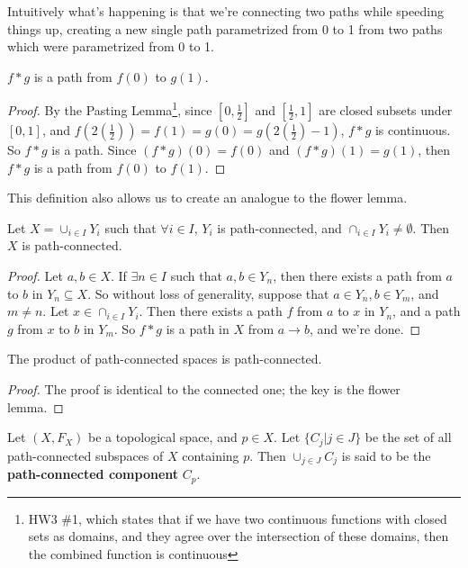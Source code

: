 Intuitively what's happening is that we're connecting two paths while  speeding things up, creating a new single path parametrized from 0 to 1 from two paths which were parametrized from 0 to 1.

\begin{smallfact}
$f\ast g$ is a path from $f(0)$ to $g(1)$. 
\end{smallfact}
\begin{proof}
By the Pasting Lemma\footnote{HW3 \#1, which states that if we have two continuous functions with closed sets as domains, and they agree over the intersection of these domains, then the combined function is continuous}, since $[0,\frac{1}{2}]$ and $[\frac{1}{2},1]$ are closed subsets under $[0,1]$, and $f(2 (\frac{1}{2} )) = f(1) = g(0) = g(2 (\frac{1}{2}) - 1 )$, $f\ast g$ is continuous. So $f\ast g$ is a path. Since $(f\ast g)(0) = f(0)$ and $(f\ast g) (1) = g(1)$, then $f\ast g$ is a path from $f(0)$ to $f(1)$. 
\end{proof}

This definition also allows us to create an analogue to the flower lemma.
\begin{theorem}
Let $X = \cup_{i\in I} Y_i$ such that  $\forall i\in I$, $Y_i$ is path-connected, and $\cap_{i\in I} Y_i \neq \emptyset$. Then $X$ is path-connected.
\end{theorem}
\begin{proof}
Let $a,b\in X$. If $\exists n\in I$ such that $a,b\in Y_n$, then there exists a path from $a$ to $b$ in $Y_n\subseteq X$. So without loss of generality, suppose that $a\in Y_n, b\in Y_m$, and $m\neq n$. Let $x\in \cap_{i\in I} Y_i$. Then there exists a path $f$ from $a$ to $x$ in $Y_n$, and a path $g$ from $x$ to $b$ in $Y_m$. So $f\ast g$ is a path in $X$ from $a \to b$, and we're done. 
\end{proof}

\begin{corollary} 
The product of path-connected spaces is path-connected.
\end{corollary}
\begin{proof}
The proof is identical to the connected one; the key is the flower lemma.
\end{proof}

\begin{definition}
Let $(X,F_X)$ be a topological space, and $p\in X$. Let $\{C_j | j\in J\}$ be the set of all path-connected subspaces of $X$ containing $p$. Then $\cup_{j\in J} C_j$ is said to be the \textbf{path-connected component} $C_p$. 
\end{definition}

